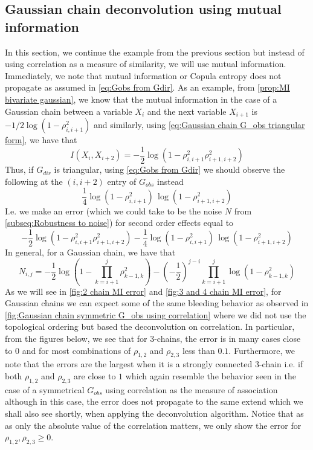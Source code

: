 \documentclass[../Thesis.tex]{subfiles}
\begin{document}
\newpage

\subsection{Gaussian chain deconvolution using mutual information}
In this section, we continue the example from the previous section but instead of using correlation as a measure of similarity, we will use mutual information. Immediately, we note that mutual information or Copula entropy does not propagate as assumed in \autoref{eq:Gobs from Gdir}. As an example, from \autoref{prop:MI bivariate gaussian}, we know that the mutual information in the case of a Gaussian chain between a variable $X_i$ and the next variable $X_{i+1}$ is $-1/2 \log\left(1 - \rho_{i,i+1}^2\right)$ and similarly, using \autoref{eq:Gaussian chain G_obs triangular form}, we have that
$$I\left(X_i, X_{i+2}\right) = -\frac{1}{2} \log \left(1 - \rho_{i,i+1}^2 \rho_{i+1,i+2}^2\right)$$
Thus, if $G_{dir}$ is triangular, using \autoref{eq:Gobs from Gdir} we should observe the following at the $(i,i+2)$ entry of $G_{obs}$ instead
$$\frac{1}{4} \log\left(1 - \rho_{i,i+1}^2\right)\,\log\left(1 - \rho_{i+1,i+2}^2\right)$$
I.e. we make an error (which we could take to be the noise $N$ from \autoref{subseq:Robustness to noise}) for second order effects equal to
$$-\frac{1}{2} \log \left(1 - \rho_{i,i+1}^2 \rho_{i+1,i+2}^2\right) - \frac{1}{4} \log\left(1 - \rho_{i,i+1}^2\right)\,\log\left(1 - \rho_{i+1,i+2}^2\right)$$
In general, for a Gaussian chain, we have that
$$N_{i,j} = -\frac{1}{2} \log\left( 1 - \prod_{k=i+1}^{j} \rho_{k-1,k}^2\right) - \left(-\frac{1}{2}\right)^{j-i}\prod_{k=i+1}^{j} \log\left(1 - \rho_{k-1,k}^2\right)$$
As we will see in \autoref{fig:2 chain MI error} and \autoref{fig:3 and 4 chain MI error}, for Gaussian chains we can expect some of the same bleeding behavior as observed in \autoref{fig:Gaussian chain symmetric G_obs using correlation} where we did not use the topological ordering but based the deconvolution on correlation. In particular, from the figures below, we see that for $3$-chains, the error is in many cases close to $0$ and for most combinations of $\rho_{1,2}$ and $\rho_{2,3}$ less than $0.1$. Furthermore, we note that the errors are the largest when it is a strongly connected $3$-chain i.e. if both $\rho_{1,2}$ and $\rho_{2,3}$ are close to $1$ which again resemble the behavior seen in the case of a symmetrical $G_{obs}$ using correlation as the measure of association although in this case, the error does not propagate to the same extend which we shall also see shortly, when applying the deconvolution algorithm. Notice that as as only the absolute value of the correlation matters, we only show the error for $\rho_{1,2}, \rho_{2,3} \geq 0$.
\end{document}
